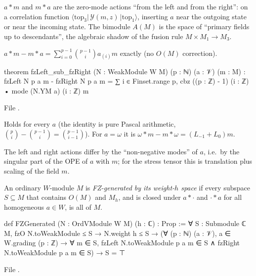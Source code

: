 \begin{physics}
$a*m$ and $m*a$ are the zero-mode actions ``from the left and from the right'': on a correlation
function $\langle\text{top}_3|\,\mathcal Y(m,z)\,|\text{top}_1\rangle$, inserting $a$ near the outgoing
state or near the incoming state.  The bimodule $A(M)$ is the space of ``primary fields up to
descendants'', the algebraic shadow of the fusion rule $M\times M_1\to M_3$.
\end{physics}

\begin{proposition}\label{ch14:prop:fzcomm}
$a*m-m*a=\sum_{i=0}^{p-1}\binom{p-1}{i}a_{(i)}m$ exactly (no $O(M)$ correction).
\end{proposition}
\begin{leancode}
theorem fzLeft_sub_fzRight (N : WeakModule W M) (p : ℕ) (a : 𝒱) (m : M) :
    fzLeft N p a m - fzRight N p a m
      = ∑ i ∈ Finset.range p, cbz ((p : ℤ) - 1) (i : ℤ) • mode (N.YM a) (i : ℤ) m
\end{leancode}
File .

\begin{dictionary}
Holds for every $a$ (the identity is pure Pascal arithmetic, $\binom pi-\binom{p-1}i=\binom{p-1}{i-1}$).
For $a=\omega$ it is $\omega*m-m*\omega=(L_{-1}+L_0)m$.
\end{dictionary}

\begin{physics}
The left and right actions differ by the ``non-negative modes'' of $a$, i.e.\ by the singular part of the
OPE of $a$ with $m$; for the stress tensor this is translation plus scaling of the field $m$.
\end{physics}

\begin{definition}\label{ch14:def:fzgen}
An ordinary $W$-module $M$ is \emph{FZ-generated by its weight-$h$ space} if every subspace
$S\subseteq M$ that contains $O(M)$ and $M_h$, and is closed under $a*\cdot$ and $\cdot*a$ for all
homogeneous $a\in W$, is all of $M$.
\end{definition}
\begin{leancode}
def FZGenerated (N : OrdVModule W M) (h : ℂ) : Prop :=
  ∀ S : Submodule ℂ M, fzO N.toWeakModule ≤ S → N.weight h ≤ S →
    (∀ (p : ℕ) (a : 𝒱), a ∈ W.grading (p : ℤ) → ∀ m ∈ S,
      fzLeft N.toWeakModule p a m ∈ S ∧ fzRight N.toWeakModule p a m ∈ S) → S = ⊤
\end{leancode}
File .

